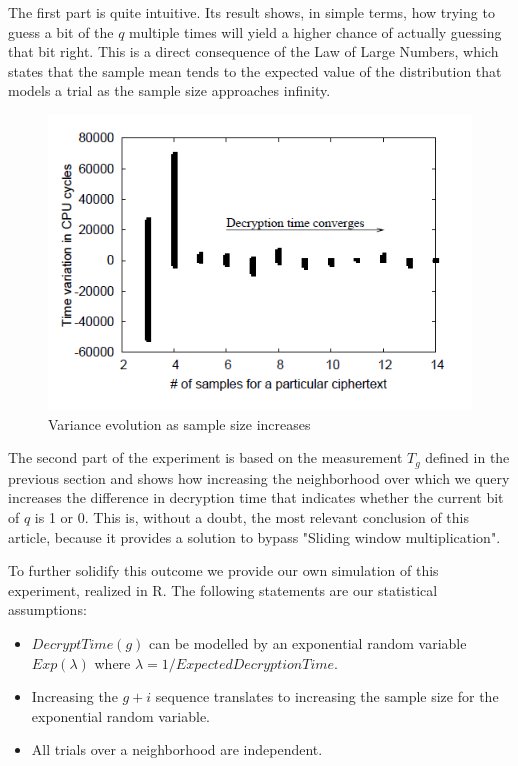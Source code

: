 \documentclass[a4paper,10pt,twocolumn,english]{article}
\begin{document}
The first part is quite intuitive. Its result shows, in simple terms, how trying to guess a bit of the $q$ multiple times will yield a higher chance of actually guessing that bit right. 
This is a direct consequence of the Law of Large Numbers, which states that the sample mean tends to the expected value of the distribution that models a trial as the sample size approaches infinity.

\begin{figure}[ht]
    \centering
    \includegraphics[width=0.9\linewidth]{ExperimentVariance.png}
    \caption{Variance evolution as sample size increases}
    \label{fig:experiment1a}
\end{figure}


The second part of the experiment is based on the measurement $T_g$ defined in the previous section
and shows how increasing the neighborhood over which we query increases the difference in decryption time that
indicates whether the current bit of $q$ is 1 or 0. This is, without a doubt, the most relevant conclusion of this article, 
because it provides a solution to bypass "Sliding window multiplication".

To further solidify this outcome we provide our own simulation of this experiment, realized in R.
The following statements are our statistical assumptions:

\begin{itemize}
    \item $DecryptTime(g)$ can be modelled by an exponential random variable $Exp(\lambda)$ where $\lambda=1/ExpectedDecryptionTime$.
    \item Increasing the $g+i$ sequence translates to increasing the sample size for the exponential random variable.
    \item All trials over a neighborhood are independent.
\end{itemize}
\end{document}
